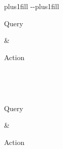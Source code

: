 \documentclass[letterpaper,10pt,english]{sphinxmanual}
\begin{document}
\begin{savenotes}
\sphinxatlongtablestart
\sphinxthistablewithglobalstyle
\makeatletter
  \LTleft \@totalleftmargin plus1fill
  \LTright\dimexpr\columnwidth-\@totalleftmargin-\linewidth\relax plus1fill
\makeatother
\begin{longtable}{}
\sphinxtoprule
\begin{varwidth}[t]{}
\sphinxstyletheadfamily \sphinxAtStartPar
Query
\sphinxbeforeendvarwidth
\end{varwidth}%
&\begin{varwidth}[t]{}
\sphinxstyletheadfamily \sphinxAtStartPar
Action
\sphinxbeforeendvarwidth
\end{varwidth}%
\\
\sphinxmidrule
\endfirsthead

\\
\sphinxtoprule
\begin{varwidth}[t]{}
\sphinxstyletheadfamily \sphinxAtStartPar
Query
\sphinxbeforeendvarwidth
\end{varwidth}%
&\begin{varwidth}[t]{}
\sphinxstyletheadfamily \sphinxAtStartPar
Action
\sphinxbeforeendvarwidth
\end{varwidth}%
\\
\sphinxmidrule
\endhead

\sphinxbottomrule
{}\\
\endfoot


\end{longtable}
\end{savenotes}
\end{document}
